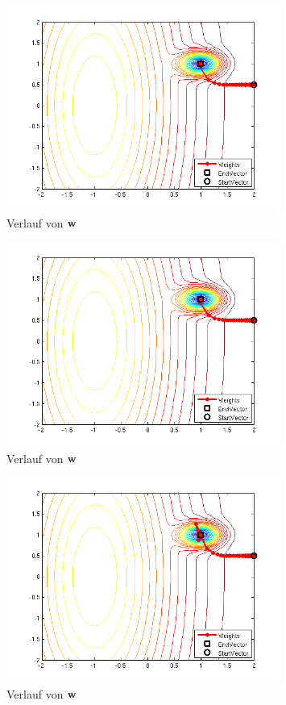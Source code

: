 \begin{figure}[h!]
  \centering
  \includegraphics[width=0.8\textwidth]{./figures/213/path_w01_eta015.png}
  \caption{Verlauf von $\mathbf{w}$}
  \label{fig:path_w01_eta015}
\end{figure}

\begin{figure}[h!]
  \centering
  \includegraphics[width=0.8\textwidth]{./figures/213/path_w01_eta01.png}
  \caption{Verlauf von $\mathbf{w}$}
  \label{fig:path_w01_eta01}
\end{figure}

\begin{figure}[h!]
  \centering
  \includegraphics[width=0.8\textwidth]{./figures/213/path_w01_eta005.png}
  \caption{Verlauf von $\mathbf{w}$}
  \label{fig:path_w01_eta005}
\end{figure}

